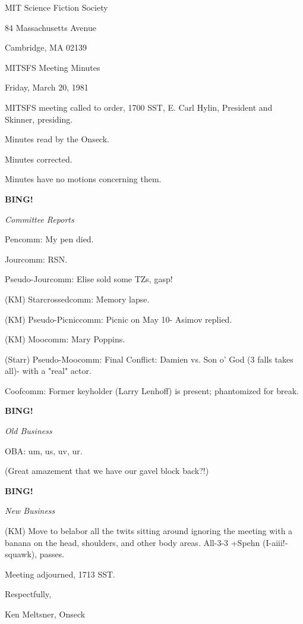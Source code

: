 \documentclass[12pt]{article}
\newcommand{\bing}{{\bf BING!} }
\newcommand{\goto}[1]{\bing \vskip 12pt \centerline{{\em{#1}}}}
\begin{document}
\begin{center}

MIT Science Fiction Society 

84 Massachusetts Avenue

Cambridge, MA 02139

\vspace{12pt}

MITSFS Meeting Minutes 

Friday, March 20, 1981

\end{center}
 
\vspace{18pt}

\setlength{\parskip}{6pt}

\noindent
MITSFS meeting called to order, 1700 SST,
E. Carl Hylin, President and Skinner, presiding.

Minutes read by the Onseck.

Minutes corrected.

Minutes have no motions concerning them.

\goto{Committee Reports}

Pencomm: My pen died.

Jourcomm: RSN.

Pseudo-Jourcomm: Elise sold some TZs, gasp!

(KM) Starcrossedcomm: Memory lapse.

(KM) Pseudo-Picniccomm: Picnic on May 10- Asimov replied.

(KM) Moocomm: Mary Poppins.

(Starr) Pseudo-Moocomm: Final Conflict: Damien vs. Son o' God (3 falls takes all)- with a "real" actor.

Coofcomm: Former keyholder (Larry Lenhoff) is present; phantomized for break.

\goto{Old Business}

OBA: um, us, uv, ur.

(Great amazement that we have our gavel block back?!)

\goto{New Business}

(KM) Move to belabor all the twits sitting around ignoring the meeting with a banana on the head, shoulders, and other body areas. All-3-3 +Spehn (I-aiii!-squawk), passes.

\vspace{12pt}

\noindent
Meeting adjourned, 1713 SST.

\vspace{18pt}

\centerline{Respectfully,}
\centerline{Ken Meltsner, Onseck}
\end{document}
